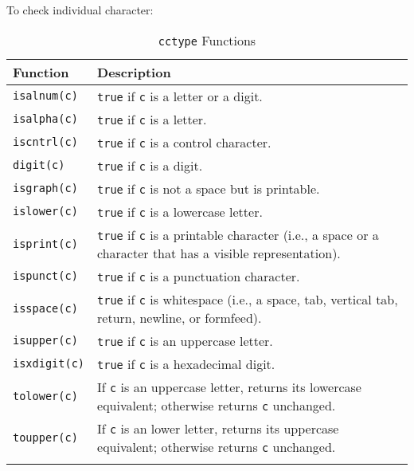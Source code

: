 To check individual character:

\begin{longtable}{p{.3\linewidth} p{.5\linewidth}} 
\toprule
Function & Description \\
\midrule
\endhead

\texttt{isalnum(c)}
& \texttt{true} if \texttt{c} is a letter or a digit.
\\

\texttt{isalpha(c)}
& \texttt{true} if \texttt{c} is a letter.
\\

\texttt{iscntrl(c)}
& \texttt{true} if \texttt{c} is a control character.
\\

\texttt{digit(c)}
& \texttt{true} if \texttt{c} is a digit.
\\

\texttt{isgraph(c)}
& \texttt{true} if \texttt{c} is not a space but is printable.
\\

\texttt{islower(c)}
& \texttt{true} if \texttt{c} is a lowercase letter.
\\

\texttt{isprint(c)}
& \texttt{true} if \texttt{c} is a printable character (i.e., a space or a character that has a visible representation).
\\

\texttt{ispunct(c)}
& \texttt{true} if \texttt{c} is a punctuation character.
\\

\texttt{isspace(c)}
& \texttt{true} if \texttt{c} is whitespace (i.e., a space, tab, vertical tab, return, newline, or formfeed).
\\

\texttt{isupper(c)}
& \texttt{true} if \texttt{c} is an uppercase letter.
\\

\texttt{isxdigit(c)}
& \texttt{true} if \texttt{c} is a hexadecimal digit.
\\

\texttt{tolower(c)}
& If \texttt{c} is an uppercase letter, returns its lowercase equivalent; otherwise returns \texttt{c} unchanged.
\\

\texttt{toupper(c)}
& If \texttt{c} is an lower letter, returns its uppercase equivalent; otherwise returns \texttt{c} unchanged.
\\

\midrule
\caption{\texttt{cctype} Functions} 
\label{tab:cctypefunctions}
\end{longtable}


